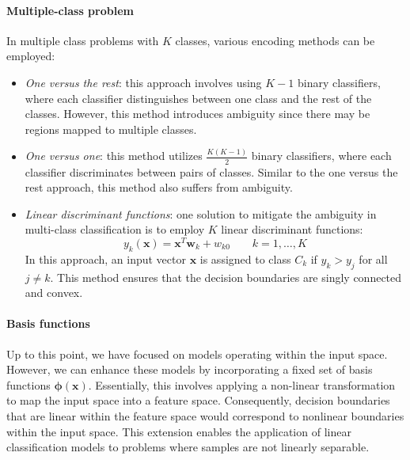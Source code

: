 \paragraph*{Multiple-class problem}
In multiple class problems with $K$ classes, various encoding methods can be employed:
\begin{itemize}
    \item \textit{One versus the rest}: this approach involves using $K-1$ binary classifiers, where each classifier distinguishes between one class and the rest of the classes.
        However, this method introduces ambiguity since there may be regions mapped to multiple classes.
    \item \textit{One versus one}: this method utilizes $\frac{K(K-1)}{2}$ binary classifiers, where each classifier discriminates between pairs of classes. 
        Similar to the one versus the rest approach, this method also suffers from ambiguity.
    \item \textit{Linear discriminant functions}: one solution to mitigate the ambiguity in multi-class classification is to employ $K$ linear discriminant functions:
        \[y_k(\textbf{x})=\textbf{x}^T\textbf{w}_k+w_{k0} \qquad k=1,\dots,K\]
        In this approach, an input vector $\textbf{x}$ is assigned to class $C_k$ if $y_k>y_j$ for all $j \neq k$. 
        This method ensures that the decision boundaries are singly connected and convex.
\end{itemize}

\paragraph*{Basis functions}
Up to this point, we have focused on models operating within the input space.
However, we can enhance these models by incorporating a fixed set of basis functions $\boldsymbol{\phi}(\textbf{x})$. 
Essentially, this involves applying a non-linear transformation to map the input space into a feature space. 
Consequently, decision boundaries that are linear within the feature space would correspond to nonlinear boundaries within the input space.
This extension enables the application of linear classification models to problems where samples are not linearly separable.

